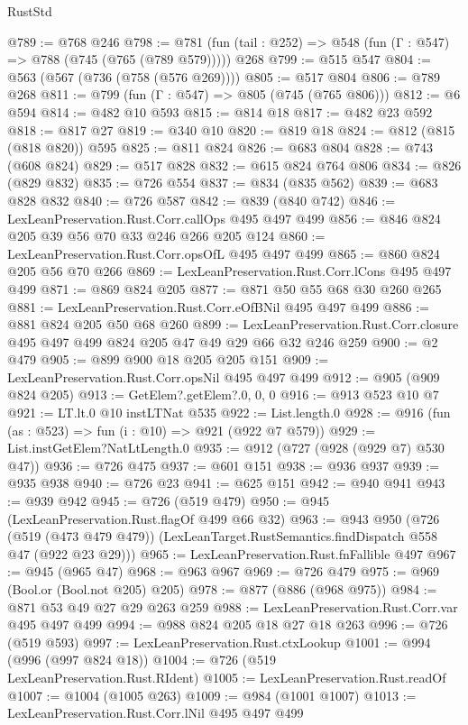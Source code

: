 \begin{lexlean}{RustStd}
\begin{coremodule}
@789 := @768 @246
@798 := @781 (fun (tail : @252) => @548 (fun (Γ : @547) => @788 (@745 (@765 (@789 @579))))) @268
@799 := @515 @547
@804 := @563 (@567 (@736 (@758 (@576 @269))))
@805 := @517 @804
@806 := @789 @268
@811 := @799 (fun (Γ : @547) => @805 (@745 (@765 @806)))
@812 := @6 @594
@814 := @482 @10 @593
@815 := @814 @18
@817 := @482 @23 @592
@818 := @817 @27
@819 := @340 @10
@820 := @819 @18
@824 := @812 (@815 (@818 @820)) @595
@825 := @811 @824
@826 := @683 @804
@828 := @743 (@608 @824)
@829 := @517 @828
@832 := @615 @824 @764 @806
@834 := @826 (@829 @832)
@835 := @726 @554
@837 := @834 (@835 @562)
@839 := @683 @828 @832
@840 := @726 @587
@842 := @839 (@840 @742)
@846 := LexLeanPreservation.Rust.Corr.callOps @495 @497 @499
@856 := @846 @824 @205 @39 @56 @70 @33 @246 @266 @205 @124
@860 := LexLeanPreservation.Rust.Corr.opsOfL @495 @497 @499
@865 := @860 @824 @205 @56 @70 @266
@869 := LexLeanPreservation.Rust.Corr.lCons @495 @497 @499
@871 := @869 @824 @205
@877 := @871 @50 @55 @68 @30 @260 @265
@881 := LexLeanPreservation.Rust.Corr.eOfBNil @495 @497 @499
@886 := @881 @824 @205 @50 @68 @260
@899 := LexLeanPreservation.Rust.Corr.closure @495 @497 @499 @824 @205 @47 @49 @29 @66 @32 @246 @259
@900 := @2 @479
@905 := @899 @900 @18 @205 @205 @151
@909 := LexLeanPreservation.Rust.Corr.opsNil @495 @497 @499
@912 := @905 (@909 @824 @205)
@913 := GetElem?.getElem?.{0, 0, 0}
@916 := @913 @523 @10 @7
@921 := LT.lt.{0} @10 instLTNat @535
@922 := List.length.{0}
@928 := @916 (fun (as : @523) => fun (i : @10) => @921 (@922 @7 @579))
@929 := List.instGetElem?NatLtLength.{0}
@935 := @912 (@727 (@928 (@929 @7) @530 @47))
@936 := @726 @475
@937 := @601 @151
@938 := @936 @937
@939 := @935 @938
@940 := @726 @23
@941 := @625 @151
@942 := @940 @941
@943 := @939 @942
@945 := @726 (@519 @479)
@950 := @945 (LexLeanPreservation.Rust.flagOf @499 @66 @32)
@963 := @943
    @950
    (@726
      (@519 (@473 @479 @479))
      (LexLeanTarget.RustSemantics.findDispatch @558 @47 (@922 @23 @29)))
@965 := LexLeanPreservation.Rust.fnFallible @497
@967 := @945 (@965 @47)
@968 := @963 @967
@969 := @726 @479
@975 := @969 (Bool.or (Bool.not @205) @205)
@978 := @877 (@886 (@968 @975))
@984 := @871 @53 @49 @27 @29 @263 @259
@988 := LexLeanPreservation.Rust.Corr.var @495 @497 @499
@994 := @988 @824 @205 @18 @27 @18 @263
@996 := @726 (@519 @593)
@997 := LexLeanPreservation.Rust.ctxLookup
@1001 := @994 (@996 (@997 @824 @18))
@1004 := @726 (@519 LexLeanPreservation.Rust.RIdent)
@1005 := LexLeanPreservation.Rust.readOf
@1007 := @1004 (@1005 @263)
@1009 := @984 (@1001 @1007)
@1013 := LexLeanPreservation.Rust.Corr.lNil @495 @497 @499

\end{coremodule}
\end{lexlean}
